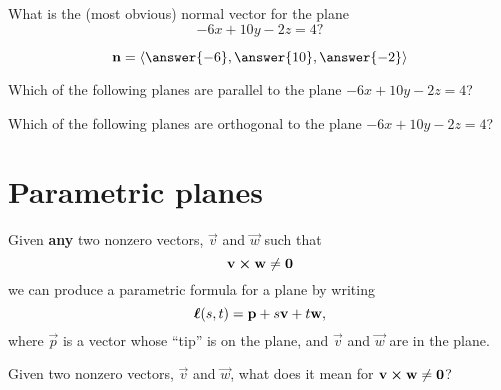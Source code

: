\documentclass{ximera}
\begin{document}
\begin{question}
  What is the (most obvious) normal vector for the plane
  \[
  -6x+10y-2z = 4?
  \]
  \begin{prompt}
    \[
    \vec{n} = \vector{\answer{-6},\answer{10},\answer{-2}}
    \]
  \end{prompt}
  \begin{question}
    Which of the following planes are parallel to the plane $-6x+10y-2z = 4$?
    \begin{selectAll}
    \end{selectAll}
      \begin{question}
    Which of the following planes are orthogonal to the plane $-6x+10y-2z = 4$?
    \begin{selectAll}
    \end{selectAll}
  \end{question}
  \end{question}
\end{question}


\section{Parametric planes}


Given \textbf{any} two nonzero vectors, $\vec{v}$ and $\vec{w}$ such that
\[
\mathbf{v}\boldsymbol\times \mathbf{w} \ne \mathbf{0}
\]
we can produce a parametric formula for a plane by writing
\[
\boldsymbol{\ell}(s,t) = \mathbf{p} + s\mathbf{v} + t\mathbf{w},
\]
where $\vec{p}$ is a vector whose ``tip'' is on the plane, and
$\vec{v}$ and $\vec{w}$ are in the plane.
\begin{question}
  Given two nonzero vectors, $\vec{v}$ and $\vec{w}$, what does it
  mean for $\mathbf{v}\boldsymbol\times \mathbf{w} \ne \mathbf{0}$?
  \begin{prompt}
    \begin{multipleChoice}
    \end{multipleChoice}
  \end{prompt}
\end{question}
\end{document}
